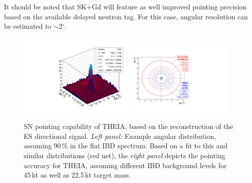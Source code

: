 It should be noted that SK+Gd will feature as well improved pointing precision based on the available delayed neutron tag. For this case, angular resolution can be estimated to $\sim$2$^{\circ}$.
\begin{figure}[h!]
\centering
\includegraphics[width=0.5\textwidth]{sn_directionality_fit.pdf}
\hfill
\includegraphics[width=0.46\textwidth]{sn_position_resolution.pdf}
\caption{SN pointing capability of THEIA, based on the reconstruction of the ES directional signal. {\it Left panel:} Example angular distribution, assuming 90\,\% in the flat IBD spectrum. Based on a fit to this and similar distributions (red net), the {\it right panel} depicts the pointing accuracy for THEIA, assuming different IBD background levels for 45\,kt as well as 22.5\,kt target mass.}
\label{fig:snpointing}
\end{figure}
